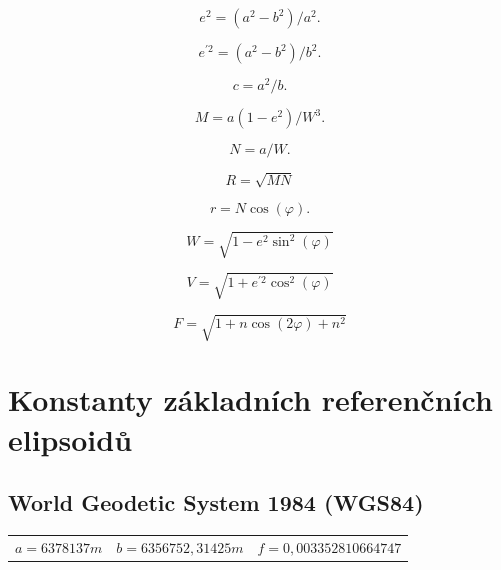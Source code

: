 \documentclass[11pt,a4paper]{article}
\begin{document}
\begin{appendices}
\begin{equation}
e^{2} = (a^{2}-b^{2})/a^{2}.
\end{equation}

\begin{equation}
e^{'2} = (a^{2}-b^{2})/b^{2}.
\end{equation}

\begin{equation}
c = a^{2}/b.
\end{equation}

\begin{equation}
M = a\left(1-e^{2}\right) / W^{3}.
\end{equation}

\begin{equation}
N = a/W.
\end{equation}

\begin{equation}
R = \sqrt{M N}
\end{equation}

\begin{equation}
r = N\cos{\left(\varphi\right)}.
\end{equation}

\begin{equation}
W = \sqrt{1-e^{2}\sin^{2}{\left(\varphi\right)}}
\end{equation}

\begin{equation}
V = \sqrt{1+e^{'2}\cos^{2}{\left(\varphi\right)}}
\end{equation}

\begin{equation}
F = \sqrt{1+n\cos{\left(2\varphi\right)}+n^{2}}
\end{equation}

\section{Konstanty základních referenčních elipsoidů} \label{appRefEllConst}

\subsection{World Geodetic System 1984 (WGS84)}\label{appRefEllConstWGS84}
\begin{table}[ht!]
\begin{tabular}{c c c}
$a = 6 378 137 m$ & $b = 6 356 752,31425 m$ & $f = 0,00335 28106 64747$ \\
\end{tabular}
\end{table}


\end{appendices}
\end{document}
